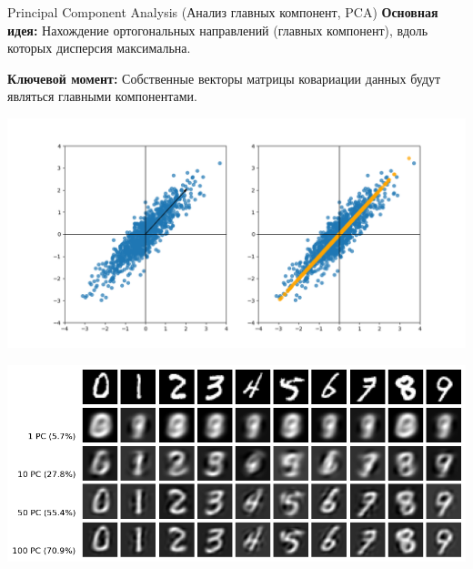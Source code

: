 \begin{frame}[allowframebreaks]{Principal Component Analysis (Анализ главных компонент, PCA)}
    \textbf{Основная идея:} Нахождение ортогональных направлений (главных компонент), вдоль которых дисперсия максимальна.

    \textbf{Ключевой момент:} Собственные векторы матрицы ковариации данных будут являться главными компонентами.

    \begin{center}
        \includegraphics[width=.65\textwidth]{../resources/methods/pca.png}
    \end{center}

    \begin{center}
        \includegraphics[width=1\textwidth]{../resources/pca/mnist_compression_demo.png}
    \end{center}

\end{frame}

